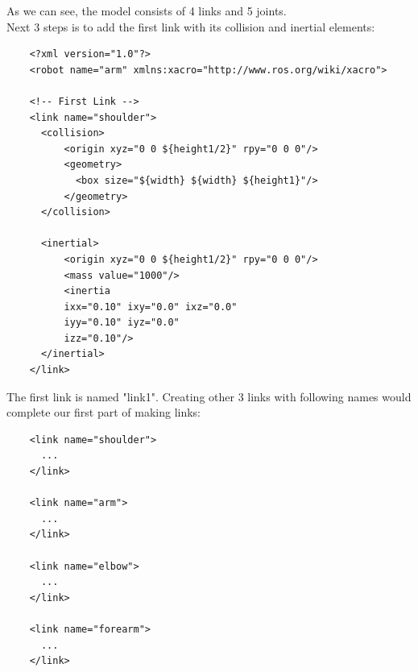\documentclass[pdftex,12pt,a4paper]{article}
\begin{document}
  \newpage
  As we can see, the model consists of 4 links and 5 joints.\\
  Next 3 steps is to add the first link with its collision and inertial elements:
  \begin{lstlisting}
    <?xml version="1.0"?>
    <robot name="arm" xmlns:xacro="http://www.ros.org/wiki/xacro">
    
    <!-- First Link -->
    <link name="shoulder">
      <collision>
          <origin xyz="0 0 ${height1/2}" rpy="0 0 0"/>
          <geometry>
    	    <box size="${width} ${width} ${height1}"/>
          </geometry>
      </collision>
    
      <inertial>
          <origin xyz="0 0 ${height1/2}" rpy="0 0 0"/>
          <mass value="1000"/>
          <inertia
    	  ixx="0.10" ixy="0.0" ixz="0.0"
    	  iyy="0.10" iyz="0.0"
    	  izz="0.10"/>
      </inertial>
    </link>
  \end{lstlisting}
  The first link is named "link1". Creating other 3 links with following names would complete our first part of making links:
  \begin{lstlisting}
    <link name="shoulder">
      ...
    </link>
    
    <link name="arm">
      ...
    </link>
    
    <link name="elbow">
      ...
    </link>
    
    <link name="forearm">
      ...
    </link>
  \end{lstlisting}
  
\end{document}
